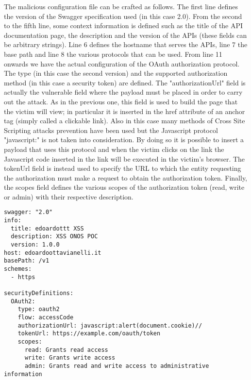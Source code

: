 \documentclass[a4paper,10pt]{memoir}
\begin{document}
The malicious configuration file can be crafted as follows. The first line defines the version of the Swagger specification used (in this case 2.0). From the second to the fifth line, some context information is defined such as the title of the API documentation page, the description and the version of the APIs (these fields can be arbitrary strings). Line 6 defines the hostname that serves the APIs, line 7 the base path and line 8 the various protocols that can be used. From line 11 onwards we have the actual configuration of the OAuth authorization protocol. The type (in this case the second version) and the supported authorization method (in this case a security token) are defined. The "authorizationUrl" field is actually the vulnerable field where the payload must be placed in order to carry out the attack. As in the previous one, this field is used to build the page that the victim will view; in particular it is inserted in the href attribute of an anchor tag (simply called a clickable link). Also in this case many methods of Cross Site Scripting attacks prevention have been used but the Javascript protocol "javascript:" is not taken into consideration. By doing so it is possible to insert a payload that uses this protocol and when the victim clicks on the link the Javascript code inserted in the link will be executed in the victim's browser. The tokenUrl field is instead used to specify the URL to which the entity requesting the authorization must make a request to obtain the authorization token. Finally, the scopes field defines the various scopes of the authorization token (read, write or admin) with their respective description.
\begin{lstlisting}
swagger: "2.0"
info:
  title: edoardottt XSS
  description: XSS ONOS POC
  version: 1.0.0
host: edoardoottavianelli.it
basePath: /v1
schemes:
  - https

securityDefinitions:
  OAuth2:
    type: oauth2
    flow: accessCode
    authorizationUrl: javascript:alert(document.cookie)//
    tokenUrl: https://example.com/oauth/token
    scopes:
      read: Grants read access
      write: Grants write access
      admin: Grants read and write access to administrative information
\end{lstlisting}
\end{document}
